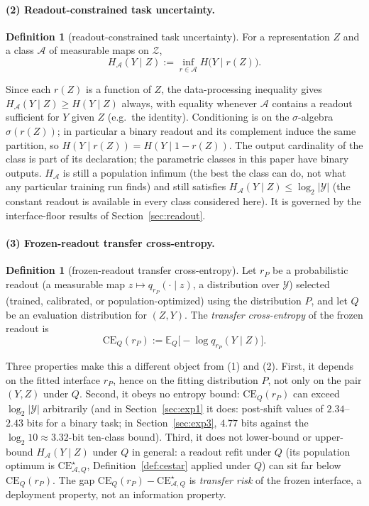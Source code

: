 \documentclass[twocolumn,10pt]{article}
\theoremstyle{definition}
\newtheorem{definition}[theorem]{Definition}
\theoremstyle{remark}
\newcommand{\E}{\mathbb{E}}
\newcommand{\cA}{\mathcal{A}}
\newcommand{\cY}{\mathcal{Y}}
\newcommand{\cZ}{\mathcal{Z}}
\newcommand{\CE}{\mathrm{CE}}
\newcommand{\CEQ}[1]{\CE_{Q}({#1})}
\newcommand{\rP}{r_{P}}
\begin{document}
\paragraph{(2) Readout-constrained task uncertainty.}

\begin{definition}[readout-constrained task uncertainty]
\label{def:ha}
For a representation $Z$ and a class $\cA$ of measurable maps on $\cZ$,
\[
H_{\cA}(Y \mid Z) := \inf_{r \in \cA} H\big(Y \mid r(Z)\big).
\]
\end{definition}

Since each $r(Z)$ is a function of $Z$, the data-processing inequality gives
$H_{\cA}(Y \mid Z) \ge H(Y \mid Z)$ always, with equality whenever $\cA$
contains a readout sufficient for $Y$ given $Z$ (e.g.\ the identity).
Conditioning is on the $\sigma$-algebra $\sigma(r(Z))$; in particular a
binary readout and its complement induce the same partition, so
$H(Y \mid r(Z)) = H(Y \mid 1 - r(Z))$. The output cardinality of the class
is part of its declaration; the parametric classes in this paper have binary
outputs. $H_{\cA}$ is still a population infimum (the best the class can
do, not what any particular training run finds) and still satisfies
$H_{\cA}(Y \mid Z) \le \log_2 |\cY|$ (the constant readout is available in
every class considered here). It is
governed by the interface-floor results of Section~\ref{sec:readout}.

\paragraph{(3) Frozen-readout transfer cross-entropy.}

\begin{definition}[frozen-readout transfer cross-entropy]
\label{def:ceq}
Let $\rP$ be a probabilistic readout (a measurable map $z \mapsto
q_{\rP}(\cdot \mid z)$, a distribution over $\cY$) selected (trained,
calibrated, or population-optimized) using the distribution $P$, and let
$Q$ be an evaluation distribution for $(Z, Y)$. The \emph{transfer
cross-entropy} of the frozen readout is
\[
\CEQ{\rP} := \E_{Q}\big[-\log q_{\rP}(Y \mid Z)\big].
\]
\end{definition}

Three properties make this a different object from (1) and (2).
First, it depends on the fitted interface $\rP$, hence on the fitting
distribution $P$, not only on the pair $(Y, Z)$ under $Q$. Second, it obeys
no entropy bound: $\CEQ{\rP}$ can exceed $\log_2 |\cY|$ arbitrarily (and in
Section~\ref{sec:exp1} it does: post-shift values of $2.34$--$2.43$
bits for a binary task; in Section~\ref{sec:exp3}, $4.77$ bits against
the $\log_2 10 \approx 3.32$-bit ten-class bound). Third, it does not lower-bound or upper-bound
$H_{\cA}(Y \mid Z)$ under $Q$ in general: a readout refit under $Q$
(its population optimum is $\CE^{\star}_{\cA, Q}$,
Definition~\ref{def:cestar} applied under $Q$) can sit far below
$\CEQ{\rP}$. The gap $\CEQ{\rP} - \CE^{\star}_{\cA, Q}$ is \emph{transfer
risk} of the frozen interface, a deployment property, not an information
property.
\end{document}
